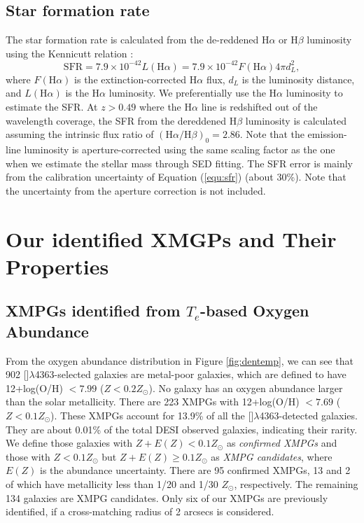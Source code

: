 \documentclass[twocolumn]{aastex631}
\newcommand{\Ha}{\mbox{H$\alpha$}}      %
\newcommand{\Hb}{\mbox{H$\beta$}}       %
\newcommand{\OIIIFOT}{[\mbox{\ion{O}{3}}]$\lambda$4363}
\newcommand{\Zsun}{\mbox{$Z_{\odot}$}}
\newcommand{\boldtext}[1]{\textcolor[rgb]{0,0,0}{#1}}
\begin{document}
\subsection{Star formation rate}
The star formation rate is calculated from the de-reddened {\Ha} or {\Hb} luminosity using the Kennicutt relation \citep{Ken98}: 
\begin{equation}
\mathrm{SFR} = 7.9\times10^{-42} L(\Ha) = 7.9\times10^{-42} F(\Ha) 4\pi d_L^2, \label{equ:sfr}
\end{equation}
where $F(\Ha)$ is the extinction-corrected {\Ha} flux, $d_L$ is the luminosity distance, and $L(\Ha)$ is the {\Ha} luminosity. We preferentially use the {\Ha} luminosity to estimate the SFR. At $z>0.49$ where the {\Ha} line is redshifted out of the wavelength coverage, the SFR from the dereddened {\Hb} luminosity is calculated assuming the intrinsic flux ratio of $(\Ha/\Hb)_0= 2.86$. Note that the emission-line luminosity is aperture-corrected using the same scaling factor as the one when we estimate the stellar mass through SED fitting. The SFR error is mainly from the calibration uncertainty of Equation (\ref{equ:sfr}) (about 30\%). Note that the uncertainty from the aperture correction is not included.


\section{Our identified XMGPs and Their Properties}\label{sec:xmpgs}
\subsection{XMPGs identified from $T_e$-based Oxygen Abundance}
From the oxygen abundance distribution in Figure \ref{fig:dentemp}, we can see that 902 \OIIIFOT-selected galaxies are metal-poor galaxies, which are defined to have 12+log(O/H) $<7.99$ ($Z < 0.2\Zsun$). No galaxy has an oxygen abundance larger than the solar metallicity. There are 223 XMPGs with 12+log(O/H) $<7.69$ ($Z < 0.1\Zsun$). These XMPGs account for 13.9\% of all the \OIIIFOT-detected galaxies. They are about 0.01\% of the total DESI observed galaxies, indicating their rarity. \boldtext{We define those galaxies with $Z+E(Z) <0.1\Zsun$ as \textit{confirmed XMPGs} and those with $Z < 0.1\Zsun$ but $Z+E(Z) \ge 0.1\Zsun$ as \textit{XMPG candidates}, where $E(Z)$ is the abundance uncertainty.} There are 95 confirmed XMPGs, 13 and 2 of which have metallicity less than 1/20 and 1/30 \Zsun, respectively. The remaining 134 galaxies are XMPG candidates. \boldtext{Only six of our XMPGs are previously identified, if a cross-matching radius of 2 arcsecs is considered.}  
\end{document}
